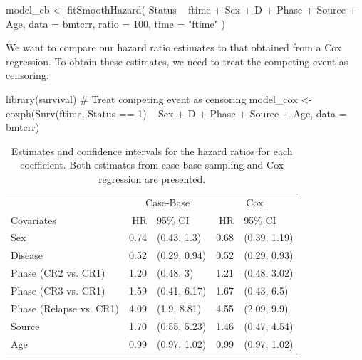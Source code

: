 \begin{Schunk}
\begin{Sinput}
model_cb <- fitSmoothHazard(
  Status ~ ftime + Sex + D + Phase + Source + Age,
  data = bmtcrr,
  ratio = 100,
  time = "ftime"
)
\end{Sinput}
\end{Schunk}

We want to compare our hazard ratio estimates to that obtained from a
Cox regression. To obtain these estimates, we need to treat the
competing event as censoring:

\begin{Schunk}
\begin{Sinput}
library(survival)
# Treat competing event as censoring
model_cox <- coxph(Surv(ftime, Status == 1) ~ Sex + D + Phase + Source + Age,
                   data = bmtcrr)
\end{Sinput}
\end{Schunk}

\begin{Schunk}
\begin{table}

\caption{\label{tab:bmtcrr-cis}Estimates and confidence intervals for the hazard ratios for each coefficient. Both estimates from case-base sampling and Cox regression are presented.}
\centering
\begin{tabular}[t]{lrlrl}
\toprule
\multicolumn{1}{c}{ } & \multicolumn{2}{c}{Case-Base} & \multicolumn{2}{c}{Cox} \\
\cmidrule(l{3pt}r{3pt}){2-3} \cmidrule(l{3pt}r{3pt}){4-5}
Covariates & HR & 95\% CI & HR & 95\% CI\\
\midrule
Sex & 0.74 & (0.43, 1.3) & 0.68 & (0.39, 1.19)\\
Disease & 0.52 & (0.29, 0.94) & 0.52 & (0.29, 0.93)\\
Phase (CR2 vs. CR1) & 1.20 & (0.48, 3) & 1.21 & (0.48, 3.02)\\
Phase (CR3 vs. CR1) & 1.59 & (0.41, 6.17) & 1.67 & (0.43, 6.5)\\
Phase (Relapse vs. CR1) & 4.09 & (1.9, 8.81) & 4.55 & (2.09, 9.9)\\
\addlinespace
Source & 1.70 & (0.55, 5.23) & 1.46 & (0.47, 4.54)\\
Age & 0.99 & (0.97, 1.02) & 0.99 & (0.97, 1.02)\\
\bottomrule
\end{tabular}
\end{table}

\end{Schunk}

